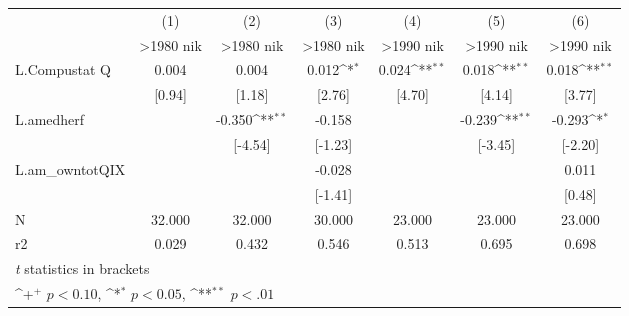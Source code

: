 {
\def\sym#1{\ifmmode^{#1}\else\(^{#1}\)\fi}
\begin{tabular}{l*{6}{c}}
\hline\hline
                    &\multicolumn{1}{c}{(1)}&\multicolumn{1}{c}{(2)}&\multicolumn{1}{c}{(3)}&\multicolumn{1}{c}{(4)}&\multicolumn{1}{c}{(5)}&\multicolumn{1}{c}{(6)}\\
                    &\multicolumn{1}{c}{>1980 nik}&\multicolumn{1}{c}{>1980 nik}&\multicolumn{1}{c}{>1980 nik}&\multicolumn{1}{c}{>1990 nik}&\multicolumn{1}{c}{>1990 nik}&\multicolumn{1}{c}{>1990 nik}\\
\hline
L.Compustat Q       &       0.004        &       0.004        &       0.012\sym{*} &       0.024\sym{**}&       0.018\sym{**}&       0.018\sym{**}\\
                    &      [0.94]        &      [1.18]        &      [2.76]        &      [4.70]        &      [4.14]        &      [3.77]        \\
L.amedherf          &                    &      -0.350\sym{**}&      -0.158        &                    &      -0.239\sym{**}&      -0.293\sym{*} \\
                    &                    &     [-4.54]        &     [-1.23]        &                    &     [-3.45]        &     [-2.20]        \\
L.am\_owntotQIX      &                    &                    &      -0.028        &                    &                    &       0.011        \\
                    &                    &                    &     [-1.41]        &                    &                    &      [0.48]        \\
\hline
N                   &      32.000        &      32.000        &      30.000        &      23.000        &      23.000        &      23.000        \\
r2                  &       0.029        &       0.432        &       0.546        &       0.513        &       0.695        &       0.698        \\
\hline\hline
\multicolumn{7}{l}{\footnotesize \textit{t} statistics in brackets}\\
\multicolumn{7}{l}{\footnotesize \sym{+} \(p<0.10\), \sym{*} \(p<0.05\), \sym{**} \(p<.01\)}\\
\end{tabular}
}
